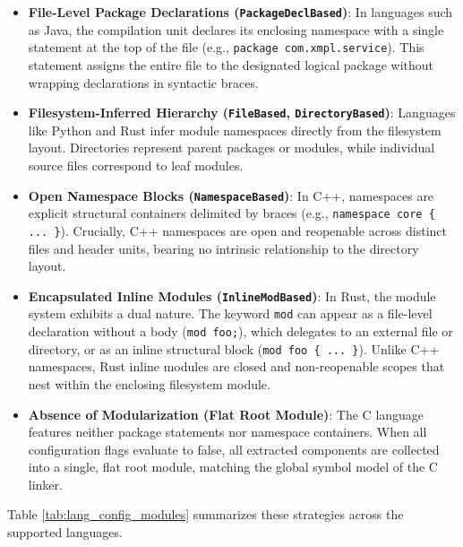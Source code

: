 \begin{itemize}
  \item \textbf{File-Level Package Declarations
    (\texttt{PackageDeclBased})}: In languages such as Java, the
    compilation unit declares its enclosing namespace with a
    single statement at the top of the file (e.g., \texttt{package
    com.xmpl.service}). This statement assigns the entire file to
    the designated logical package without wrapping declarations in
    syntactic braces.
  \item \textbf{Filesystem-Inferred Hierarchy (\texttt{FileBased},
    \texttt{DirectoryBased})}: Languages like Python and Rust infer
    module namespaces directly from the filesystem layout.
    Directories represent parent packages or modules, while
    individual source files correspond to leaf modules.
  \item \textbf{Open Namespace Blocks (\texttt{NamespaceBased})}: In
    C++, namespaces are explicit structural containers delimited by
    braces (e.g., \texttt{namespace core \{ ... \}}). Crucially, C++
    namespaces are open and reopenable across distinct files and
    header units, bearing no intrinsic relationship to the directory layout.
  \item \textbf{Encapsulated Inline Modules
    (\texttt{InlineModBased})}: In Rust, the module system exhibits a
    dual nature. The keyword \texttt{mod} can appear as a file-level
    declaration without a body (\texttt{mod foo;}), which delegates
    to an external file or directory, or as an inline structural
    block (\texttt{mod foo \{ ... \}}). Unlike C++ namespaces, Rust
    inline modules are closed and non-reopenable scopes that nest
    within the enclosing filesystem module.
  \item \textbf{Absence of Modularization (Flat Root Module)}: The C
    language features neither package statements nor namespace
    containers. When all configuration flags evaluate to false, all
    extracted components are collected into a single, flat root
    module, matching the global symbol model of the C linker.
\end{itemize}

Table \ref{tab:lang_config_modules} summarizes these strategies
across the supported languages.

